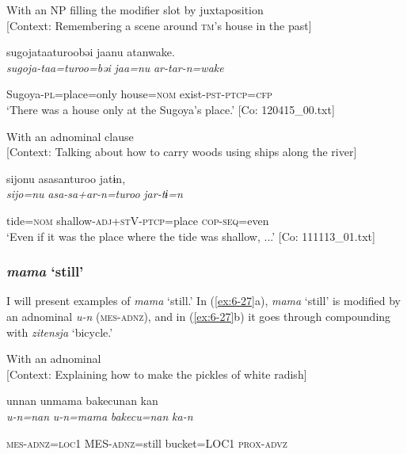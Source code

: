 \ea\label{ex:6-26}
\ea With an NP filling the modifier slot by juxtaposition\\{}
[Context: Remembering a scene around \textsc{tm}’s house in the past]

{\TM}
\glll sugojataaturoobəi  jaanu  atanwake.\\

      \textit{sugoja-taa=turoo=bəi}  \textit{jaa=nu}  \textit{ar-tar-n=wake}

      Sugoya-\textsc{pl}=place=only  house=\textsc{nom}  exist-\textsc{pst}-\textsc{ptcp}=\textsc{cfp}\\
\glt ‘There was a house only at the Sugoya’s place.’ [Co: 120415\_00.txt]
\z

\ex With an adnominal clause\\{}
[Context: Talking about how to carry woods using ships along the river]

{\TM}
\glll {\textbar}sijo{\textbar}nu  asasanturoo  jatɨn,\\

      \textit{sijo=nu}  \textit{asa-sa+ar-n=turoo}  \textit{jar-tɨ=n}

      tide=\textsc{nom}  shallow-\textsc{adj}+\textsc{st}V-\textsc{ptcp}=place  \textsc{cop}-\textsc{seq}=even\\
\glt ‘Even if it was the place where the tide was shallow, ...’ [Co: 111113\_01.txt]
\z

\subsubsection{ \textit{mama} ‘still’}

I will present examples of \textit{mama} ‘still.’ In (\ref{ex:6-27}a), \textit{mama} ‘still’ is modified by an adnominal \textit{u-n} (\textsc{mes}-\textsc{adnz}), and in (\ref{ex:6-27}b) it goes through compounding with \textit{zitensja} ‘bicycle.’

\ea\label{ex:6-27}
\ea With an adnominal\\{}
[Context: Explaining how to make the pickles of white radish]

{\TM}
\glll unnan  unmama  {\textbar}bakecu{\textbar}nan  kan\\

      \textit{u-n=nan}  \textit{u-n=mama}  \textit{bakecu=nan}  \textit{ka-n}

      \textsc{mes}-\textsc{adnz}=\textsc{loc}1  MES-\textsc{adnz}=still  bucket=LOC1  \textsc{prox}-\textsc{advz}

